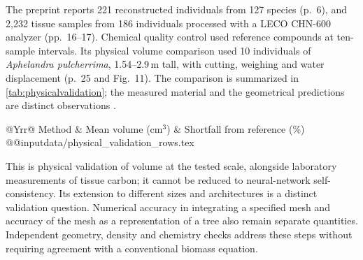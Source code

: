 \documentclass[11pt,a4paper]{article}
\theoremstyle{remark}
\begin{document}
The preprint reports 221 reconstructed individuals from 127 species (p.~6), and 2,232 tissue samples from 186 individuals processed with a LECO CHN-600 analyzer (pp.~16--17). Chemical quality control used reference compounds at ten-sample intervals. Its physical volume comparison used 10 individuals of \textit{Aphelandra pulcherrima}, 1.54--2.9\,m tall, with cutting, weighing and water displacement (p.~25 and Fig.~11). The comparison is summarized in \cref{tab:physicalvalidation}; the measured material and the geometrical predictions are distinct observations \citep{Arellano2016}.

\begin{table}[htbp]
\centering\small
\caption{Reported physical-volume validation in the original preprint \citep[p.~25]{Arellano2016}. The same 10 \textit{Aphelandra pulcherrima} individuals provide the reference and reconstruction comparison. Mean volumes are source-reported; the final column gives the non-negative shortfall from the water-displacement reference, calculated from the displayed means and rounded to one decimal place. All three reconstructions fall below the reference, with the 1-mm voxel grid showing the largest shortfall. It is a difference of sample means, not an individual-error bound or a pantropical confidence interval.}
\label{tab:physicalvalidation}
\begin{tabularx}{\textwidth}{@{}Yrr@{}}
\toprule
Method & Mean volume (cm$^3$) & Shortfall from reference (\%)\\
\midrule
\csname @@input\endcsname data/physical_validation_rows.tex
\bottomrule
\end{tabularx}
\end{table}

This is physical validation of volume at the tested scale, alongside laboratory measurements of tissue carbon; it cannot be reduced to neural-network self-consistency. Its extension to different sizes and architectures is a distinct validation question. Numerical accuracy in integrating a specified mesh and accuracy of the mesh as a representation of a tree also remain separate quantities. Independent geometry, density and chemistry checks address these steps without requiring agreement with a conventional biomass equation.
\end{document}
